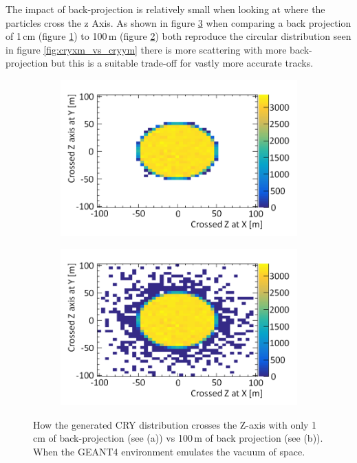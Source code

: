 The impact of back-projection is relatively small when looking at where the particles cross the z Axis. As shown in figure \ref{fig:Crossed_atZ_XY_AndShort} when comparing a back projection of 1\,cm (figure \ref{subFig:CrossedZAxisShort}) to 100\,m (figure \ref{subFig:Crossed_atZ_XY}) both reproduce the circular distribution seen in figure \ref{fig:cryxm_vs_cryym} there is more scattering with more back-projection but this is a suitable trade-off for vastly more accurate tracks. 

\begin{figure}[!h]
\centering
\begin{subfigure}{.5\textwidth}
  \centering
  \includegraphics[width=\linewidth]{Chapter4/Figs/Raster/CryPlots/CrossedZAxisShortMedText.png}
  \captionsetup{width=.9\linewidth}
  \caption{}
  \label{subFig:CrossedZAxisShort}
\end{subfigure}%
\begin{subfigure}{.5\textwidth}
  \centering
  \includegraphics[width=\linewidth]{Chapter4/Figs/Raster/CryPlots/Crossed_atZ_XYMedText.png}
  \captionsetup{width=.9\linewidth}
  \caption{}
  \label{subFig:Crossed_atZ_XY}
\end{subfigure}
\caption{How the generated CRY distribution crosses the Z-axis with only 1\,cm of back-projection (see (a)) vs 100\,m of back projection (see (b)). When the GEANT4 environment emulates the vacuum of space.}
\label{fig:Crossed_atZ_XY_AndShort}
\end{figure}

